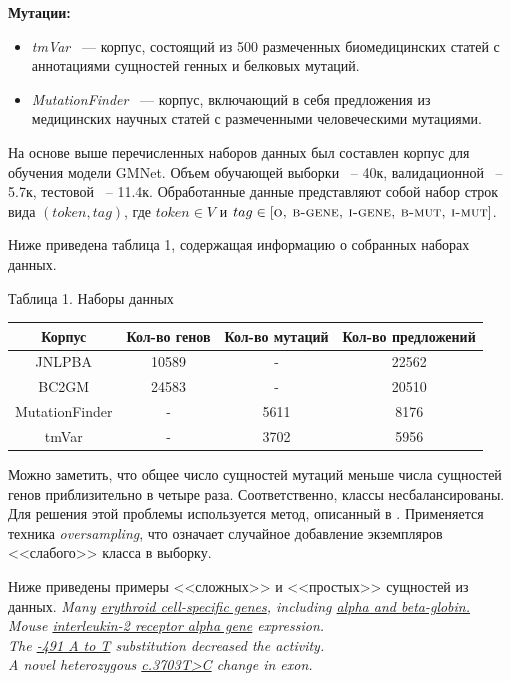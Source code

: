 \documentclass[12pt, a4paper]{article} %
\begin{document}
	\bigskip
	
		\textbf{Мутации:}
	\begin{itemize}
		\item \textit{tmVar} \cite{pmid23564842} ~--- корпус, состоящий из 500 размеченных биомедицинских статей с аннотациями сущностей генных и белковых мутаций. 
		\item \textit{MutationFinder} \cite{pmid27256315} ~--- корпус, включающий в себя предложения из медицинских научных статей с размеченными человеческими мутациями.
	\end{itemize}

На основе выше перечисленных наборов данных был составлен корпус для обучения модели GMNet. Объем обучающей выборки ~-- 40к, валидационной ~-- 5.7к, тестовой ~-- 11.4к. Обработанные данные представляют собой набор строк вида $\left(token, tag\right)$, где $token\in V$ и $tag\in \left[\textsc{o, b-gene, i-gene, b-mut, i-mut}\right]$. 


\bigskip

Ниже приведена таблица 1, содержащая информацию о собранных наборах данных.
\begin{center}
	 
	\begin{table}[h]
		\centering
		Таблица 1. Наборы данных
		\begin{tabular}{cccc}
			\hline Корпус & Кол-во генов & Кол-во мутаций & Кол-во предложений\\
			\hline JNLPBA & 10589 & - & 22562\\
			BC2GM & 24583 & - & 20510\\
			\hline
			MutationFinder & - & 5611 & 8176\\
			tmVar & - & 3702 & 5956\\
			\hline 
		\end{tabular}
		\label{Tab:2}
	\end{table}
\end{center}

Можно заметить, что общее число сущностей мутаций меньше числа сущностей генов приблизительно в четыре раза. Соответственно, классы несбалансированы. Для решения этой проблемы используется метод, описанный в \cite{Padurariu2019}. Применяется техника \textit{oversampling}, что означает случайное добавление экземпляров <<слабого>> класса в выборку. 

\bigskip

Ниже приведены примеры <<сложных>> и <<простых>> сущностей из данных.
\textit{Many \underline{erythroid cell-specific genes}, including \underline{alpha and beta-globin.}}
\\
\textit{Mouse \underline{interleukin-2 receptor alpha gene} expression.}
\\
\textit{The \underline{-491 A to T} substitution decreased the activity.}
\\
\textit{A novel heterozygous \underline{c.3703T>C} change in exon.}
\end{document}
